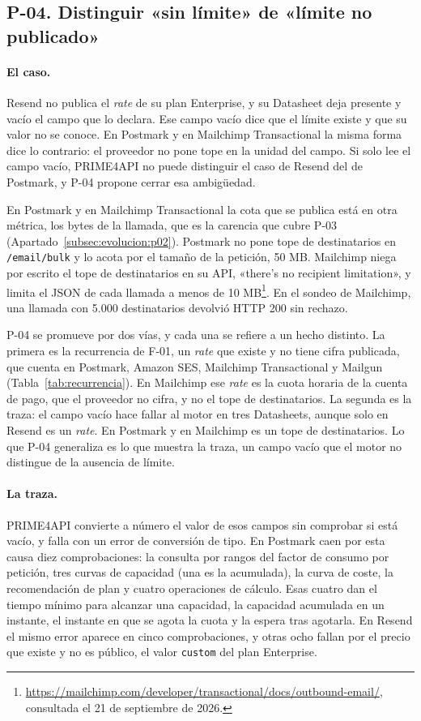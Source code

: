\subsection{P-04. Distinguir «sin límite» de «límite no publicado»}
\label{subsec:evolucion:p04}

\paragraph{El caso.}
Resend no publica el \textit{rate} de su plan Enterprise, y su Datasheet deja presente y vacío el campo que lo declara.
Ese campo vacío dice que el límite existe y que su valor no se conoce.
En Postmark y en Mailchimp Transactional la misma forma dice lo contrario: el proveedor no pone tope en la unidad del campo.
Si solo lee el campo vacío, PRIME4API no puede distinguir el caso de Resend del de Postmark, y P-04 propone cerrar esa ambigüedad.

En Postmark y en Mailchimp Transactional la cota que se publica está en otra métrica, los bytes de la llamada, que es la carencia que cubre P-03 (Apartado~\ref{subsec:evolucion:p02}).
Postmark no pone tope de destinatarios en \texttt{/email/bulk} y lo acota por el tamaño de la petición, 50 MB.
Mailchimp niega por escrito el tope de destinatarios en su API, «there's no recipient limitation», y limita el JSON de cada llamada a menos de 10 MB\footnote{\url{https://mailchimp.com/developer/transactional/docs/outbound-email/}, consultada el 21 de septiembre de 2026.}.
En el sondeo de Mailchimp, una llamada con 5.000 destinatarios devolvió HTTP 200 sin rechazo.

P-04 se promueve por dos vías, y cada una se refiere a un hecho distinto.
La primera es la recurrencia de F-01, un \textit{rate} que existe y no tiene cifra publicada, que cuenta en Postmark, Amazon SES, Mailchimp Transactional y Mailgun (Tabla~\ref{tab:recurrencia}).
En Mailchimp ese \textit{rate} es la cuota horaria de la cuenta de pago, que el proveedor no cifra, y no el tope de destinatarios.
La segunda es la traza: el campo vacío hace fallar al motor en tres Datasheets, aunque solo en Resend es un \textit{rate}.
En Postmark y en Mailchimp es un tope de destinatarios.
Lo que P-04 generaliza es lo que muestra la traza, un campo vacío que el motor no distingue de la ausencia de límite.

\paragraph{La traza.}
PRIME4API convierte a número el valor de esos campos sin comprobar si está vacío, y falla con un error de conversión de tipo.
En Postmark caen por esta causa diez comprobaciones: la consulta por rangos del factor de consumo por petición, tres curvas de capacidad (una es la acumulada), la curva de coste, la recomendación de plan y cuatro operaciones de cálculo.
Esas cuatro dan el tiempo mínimo para alcanzar una capacidad, la capacidad acumulada en un instante, el instante en que se agota la cuota y la espera tras agotarla.
En Resend el mismo error aparece en cinco comprobaciones, y otras ocho fallan por el precio que existe y no es público, el valor \texttt{custom} del plan Enterprise.


